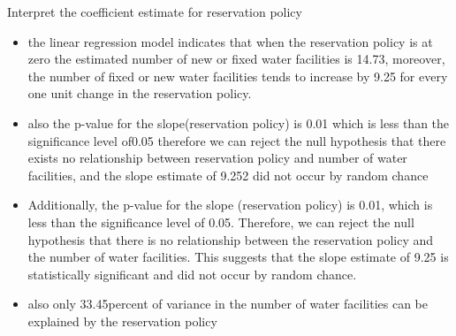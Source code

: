 \documentclass[12pt,letterpaper]{article}
\begin{document}
	Interpret the coefficient estimate for reservation policy
	\begin{itemize}
	\item  the linear regression model indicates that when the reservation policy is at zero the estimated number of new or fixed water facilities is 14.73, moreover, the number of fixed or new water facilities tends to increase by 9.25 for every one unit change in the reservation policy.
	\item also the p-value for the slope(reservation policy) is 0.01 which is less than the significance level of0.05 therefore we can reject the null hypothesis that there exists no relationship between reservation policy and number of water facilities, and the slope estimate of 9.252 did not occur by random chance 
	\item Additionally, the p-value for the slope (reservation policy) is 0.01, which is less than the significance level of 0.05. Therefore, we can reject the null hypothesis that there is no relationship between the reservation policy and the number of water facilities. This suggests that the slope estimate of 9.25 is statistically significant and did not occur by random chance. 
	\item also only 33.45percent of variance in the number of water facilities can be explained by the reservation policy 
	\end{itemize}
	
	
	
	
\end{document}
